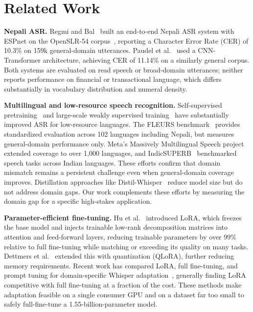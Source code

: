 \documentclass[11pt,a4paper]{article}
\begin{document}
\section{Related Work}
\label{sec:related}

\textbf{Nepali ASR.} Regmi and Bal~\cite{regmi2021} built an end-to-end
Nepali ASR system with ESPnet on the OpenSLR-54 corpus~\cite{openslr54}, reporting a Character Error
Rate (CER) of 10.3\% on 159k general-domain utterances. Paudel et
al.~\cite{paudel2023} used a CNN-Transformer architecture, achieving CER of
11.14\% on a similarly general corpus. Both systems are evaluated on
read speech or broad-domain utterances; neither reports performance on
financial or transactional language, which differs substantially in
vocabulary distribution and numeral density.

\textbf{Multilingual and low-resource speech recognition.}
Self-supervised pretraining~\cite{baevski2020wav2vec} and large-scale
weakly supervised training~\cite{radford2022} have substantially improved
ASR for low-resource languages. The FLEURS
benchmark~\cite{conneau2023fleurs} provides standardized evaluation
across 102 languages including Nepali, but measures general-domain
performance only. Meta's Massively Multilingual Speech
project~\cite{pratap2024scaling} extended coverage to over 1,000
languages, and IndicSUPERB~\cite{javed2023indicsuperb} benchmarked speech
tasks across Indian languages. These efforts confirm that domain mismatch
remains a persistent challenge even when general-domain coverage improves.
Distillation approaches like Distil-Whisper~\cite{gandhi2023distilwhisper}
reduce model size but do not address domain gaps. Our work complements
these efforts by measuring the domain gap for a specific high-stakes
application.

\textbf{Parameter-efficient fine-tuning.} Hu et
al.~\cite{hu2022lora} introduced LoRA, which freezes the base model and
injects trainable low-rank decomposition matrices into attention and
feed-forward layers, reducing trainable parameters by over 99\% relative
to full fine-tuning while matching or exceeding its quality on many tasks.
Dettmers et al.~\cite{dettmers2023qlora} extended this with quantization
(QLoRA), further reducing memory requirements. Recent work has compared
LoRA, full fine-tuning, and prompt tuning for domain-specific Whisper
adaptation~\cite{chen2024whisperaat}, generally finding LoRA competitive
with full fine-tuning at a fraction of the cost. These methods make
adaptation feasible on a single consumer GPU and on a dataset far too
small to safely full-fine-tune a 1.55-billion-parameter model.
\end{document}
